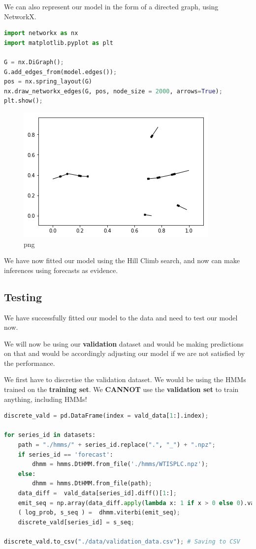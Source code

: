 We can also represent our model in the form of a directed graph, using
NetworkX.

\begin{lstlisting}[language=Python]
import networkx as nx
import matplotlib.pyplot as plt

G = nx.DiGraph();
G.add_edges_from(model.edges());
pos = nx.spring_layout(G)
nx.draw_networkx_edges(G, pos, node_size = 2000, arrows=True);
plt.show();
\end{lstlisting}

\begin{figure}
\centering
\includegraphics{Implementation_files/Implementation_64_0.png}
\caption{png}
\end{figure}

We have now fitted our model using the Hill Climb search, and now can
make inferences using forecasts as evidence.

\hypertarget{testing}{%
\subsection{Testing}\label{testing}}

We have successfully fitted our model to the data and need to test our
model now.

We will now be using our \textbf{validation} dataset and would be making
predictions on that and would be accordingly adjusting our model if we
are not satisfied by the performance.

We first have to discretise the validation dataset. We would be using
the HMMs trained on the \textbf{training set}. We \textbf{CANNOT} use
the \textbf{validation set} to train anything, including HMMs!

\begin{lstlisting}[language=Python]
discrete_vald = pd.DataFrame(index = vald_data[1:].index);

for series_id in datasets:
    path = "./hmms/" + series_id.replace(".", "_") + ".npz";
    if series_id == 'forecast':
        dhmm = hmms.DtHMM.from_file('./hmms/WTISPLC.npz');
    else:
        dhmm = hmms.DtHMM.from_file(path);
    data_diff =  vald_data[series_id].diff()[1:];
    emit_seq = np.array(data_diff.apply(lambda x: 1 if x > 0 else 0).values);
    ( log_prob, s_seq ) =  dhmm.viterbi(emit_seq);
    discrete_vald[series_id] = s_seq;

discrete_vald.to_csv("./data/validation_data.csv"); # Saving to CSV
\end{lstlisting}

